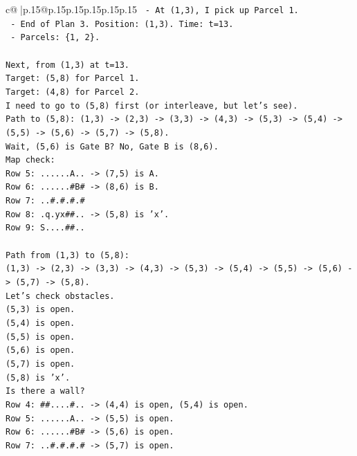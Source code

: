 \documentclass{article}
\begin{document}
{\begin{supertabular}{c@{$\;$}|p{.15\linewidth}@{}p{.15\linewidth}p{.15\linewidth}p{.15\linewidth}p{.15\linewidth}p{.15\linewidth}}
{{{\texttt{  {-} At (1,3), I pick up Parcel 1.} \\
\texttt{  {-} End of Plan 3. Position: (1,3). Time: t=13.} \\
\texttt{  {-} Parcels: \{1, 2\}.} \\
\\ 
\texttt{Next, from (1,3) at t=13.} \\
\texttt{Target: (5,8) for Parcel 1.} \\
\texttt{Target: (4,8) for Parcel 2.} \\
\texttt{I need to go to (5,8) first (or interleave, but let's see).} \\
\texttt{Path to (5,8): (1,3) {-}> (2,3) {-}> (3,3) {-}> (4,3) {-}> (5,3) {-}> (5,4) {-}> (5,5) {-}> (5,6) {-}> (5,7) {-}> (5,8).} \\
\texttt{Wait, (5,6) is Gate B? No, Gate B is (8,6).} \\
\texttt{Map check:} \\
\texttt{Row 5: ......A.. {-}> (7,5) is A.} \\
\texttt{Row 6: ......\#B\# {-}> (8,6) is B.} \\
\texttt{Row 7: ..\#.\#.\#.\#} \\
\texttt{Row 8: .q.yx\#\#.. {-}> (5,8) is 'x'.} \\
\texttt{Row 9: S....\#\#..} \\
\\ 
\texttt{Path from (1,3) to (5,8):} \\
\texttt{(1,3) {-}> (2,3) {-}> (3,3) {-}> (4,3) {-}> (5,3) {-}> (5,4) {-}> (5,5) {-}> (5,6) {-}> (5,7) {-}> (5,8).} \\
\texttt{Let's check obstacles.} \\
\texttt{(5,3) is open.} \\
\texttt{(5,4) is open.} \\
\texttt{(5,5) is open.} \\
\texttt{(5,6) is open.} \\
\texttt{(5,7) is open.} \\
\texttt{(5,8) is 'x'.} \\
\texttt{Is there a wall?} \\
\texttt{Row 4: \#\#....\#.. {-}> (4,4) is open, (5,4) is open.} \\
\texttt{Row 5: ......A.. {-}> (5,5) is open.} \\
\texttt{Row 6: ......\#B\# {-}> (5,6) is open.} \\
\texttt{Row 7: ..\#.\#.\#.\# {-}> (5,7) is open.} \\
}}}
\end{supertabular}}
\end{document}
